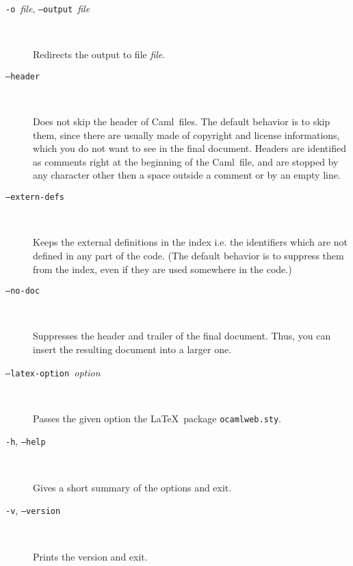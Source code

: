 \documentclass[12pt]{article}
\newcommand{\Caml}{\textsf{Caml}}
\begin{document}
\begin{description}

\item[\texttt{-o }\textit{file}, \texttt{--output }\textit{file}] ~\par
  
  Redirects the output to file \textit{file}.

\item[\texttt{--header}] ~\par

  Does not skip the header of \Caml\ files. The default behavior is to
  skip them, since there are usually made of copyright and license
  informations, which you do not want to see in the final document.
  Headers are identified as comments right at the beginning of the
  \Caml\ file, and are stopped by any character other then a space
  outside a comment or by an empty line. 

\item[\texttt{--extern-defs}] ~\par

  Keeps the external definitions in the index i.e. the identifiers
  which are not defined in any part of the code. (The default behavior
  is to suppress them from the index, even if they are used somewhere
  in the code.)

\item[\texttt{--no-doc}] ~\par

  Suppresses the header and trailer of the final document. Thus, you can
  insert the resulting document into a larger one.

\item[\texttt{--latex-option }\textit{option}] ~\par

  Passes the given option the \LaTeX\ package \texttt{ocamlweb.sty}. 

\item[\texttt{-h}, \texttt{--help}] ~\par

  Gives a short summary of the options and exit.

\item[\texttt{-v}, \texttt{--version}] ~\par

  Prints the version and exit.

\end{description}

\end{document}
